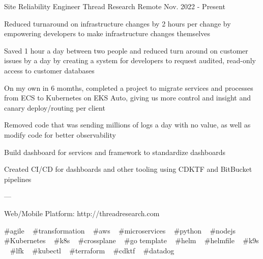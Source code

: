 

\begin{cventries}

  \cventry
    {Site Reliability Engineer} %
    {Thread Research} %
    {Remote} %
    {Nov. 2022 - Present} %
    {
      \begin{cvitems} %
        \item {Reduced turnaround on infrastructure changes by 2 hours per change by empowering developers to make infrastructure changes themselves}
        \item {Saved 1 hour a day between two people and reduced turn around on customer issues by a day by creating a system for developers to request audited, read-only access to customer databases}
        \item {On my own in 6 momths, completed a project to migrate services and processes from ECS to Kubernetes on EKS Auto, giving us more control and insight and canary deploy/routing per client}
        \item {Removed code that was sending millions of logs a day with no value, as well as modify code for better observability}
        \item {Build dashboard for services and framework to standardize dashboards}
        \item {Created CI/CD for dashboards and other tooling using CDKTF and BitBucket pipelines}
        \item {---}
        \item {Web/Mobile Platform: http://threadresearch.com}
      \end{cvitems}
    }
    {
      \begin{cvtechnologies}
        \#agile ~
        \#transformation ~
        \#aws ~
        \#microservices ~
        \#python ~
        \#nodejs ~
        \#Kubernetes ~
        \#k8s ~
        \#crossplane ~
        \#go template ~
        \#helm ~
        \#helmfile ~
        \#k9s ~
        \#lfk ~
        \#kubectl ~
        \#terraform ~
        \#cdktf ~
        \#datadog ~
      \end{cvtechnologies}
     }


\end{cventries}
